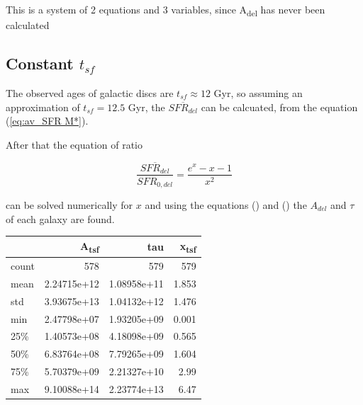 \documentclass[a4paper,twocolumn]{article}
\begin{document}
This is a system of 2 equations and 3 variables, since A\textsubscript{del} has never been calculated

\subsection{Constant \(t_{sf}\)}
\label{sec:org4a83115}
The observed ages of galactic discs are \(t_{sf}\approx 12\) Gyr\autocite{knoxSurveyCoolWhite1999}, so assuming an approximation of \(t_{sf}=12.5\) Gyr, the \(\overline{SFR_{del}}\) can be calcuated, from the equation (\ref{eq:av_SFR M*}).

After that the equation of ratio



\begin{equation} \label{eq:ratio}
    \frac{\overline{SFR_{del}}}{SFR_{0,del}}=\frac{e^x-x-1}{x^2}
\end{equation}

can be solved numerically for \(x\) and using the equations () and () the \(A_{del}\) and \(\tau\) of each galaxy are found.

\begin{center}
\begin{tabular}{lrrr}
 & A\textsubscript{tsf} & tau & x\textsubscript{tsf}\\[0pt]
\hline
count & 578 & 579 & 579\\[0pt]
mean & 2.24715e+12 & 1.08958e+11 & 1.853\\[0pt]
std & 3.93675e+13 & 1.04132e+12 & 1.476\\[0pt]
min & 2.47798e+07 & 1.93205e+09 & 0.001\\[0pt]
25\% & 1.40573e+08 & 4.18098e+09 & 0.565\\[0pt]
50\% & 6.83764e+08 & 7.79265e+09 & 1.604\\[0pt]
75\% & 5.70379e+09 & 2.21327e+10 & 2.99\\[0pt]
max & 9.10088e+14 & 2.23774e+13 & 6.47\\[0pt]
\end{tabular}
\end{center}
\end{document}
